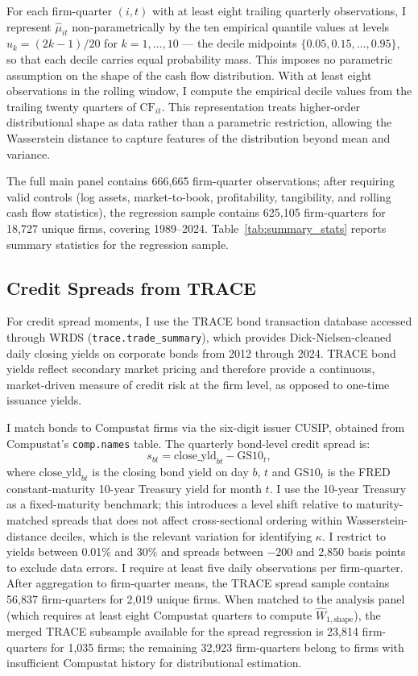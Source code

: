 For each firm-quarter $(i,t)$ with at least eight trailing quarterly observations, I represent $\hat{\mu}_{it}$ non-parametrically by the ten empirical quantile values at levels $u_k = (2k-1)/20$ for $k = 1,\ldots,10$ — the decile midpoints $\{0.05, 0.15, \ldots, 0.95\}$, so that each decile carries equal probability mass. This imposes no parametric assumption on the shape of the cash flow distribution. With at least eight observations in the rolling window, I compute the empirical decile values from the trailing twenty quarters of $\text{CF}_{it}$. This representation treats higher-order distributional shape as data rather than a parametric restriction, allowing the Wasserstein distance to capture features of the distribution beyond mean and variance.

The full main panel contains 666,665 firm-quarter observations; after requiring valid controls (log assets, market-to-book, profitability, tangibility, and rolling cash flow statistics), the regression sample contains 625,105 firm-quarters for 18,727 unique firms, covering 1989--2024. Table~\ref{tab:summary_stats} reports summary statistics for the regression sample.

\subsection{Credit Spreads from TRACE}

For credit spread moments, I use the TRACE bond transaction database accessed through WRDS (\texttt{trace.trade\_summary}), which provides Dick-Nielsen-cleaned daily closing yields on corporate bonds from 2012 through 2024. TRACE bond yields reflect secondary market pricing and therefore provide a continuous, market-driven measure of credit risk at the firm level, as opposed to one-time issuance yields.

I match bonds to Compustat firms via the six-digit issuer CUSIP, obtained from Compustat's \texttt{comp.names} table. The quarterly bond-level credit spread is:
\[
  s_{bt} = \text{close\_yld}_{bt} - \text{GS10}_t,
\]
where $\text{close\_yld}_{bt}$ is the closing bond yield on day $b$, $t$ and $\text{GS10}_t$ is the FRED constant-maturity 10-year Treasury yield for month $t$. I use the 10-year Treasury as a fixed-maturity benchmark; this introduces a level shift relative to maturity-matched spreads that does not affect cross-sectional ordering within Wasserstein-distance deciles, which is the relevant variation for identifying $\kappa$. I restrict to yields between 0.01\% and 30\% and spreads between $-200$ and 2,850 basis points to exclude data errors. I require at least five daily observations per firm-quarter. After aggregation to firm-quarter means, the TRACE spread sample contains 56,837 firm-quarters for 2,019 unique firms. When matched to the analysis panel (which requires at least eight Compustat quarters to compute $\widehat{W}_{1,\text{shape}}$), the merged TRACE subsample available for the spread regression is 23,814 firm-quarters for 1,035 firms; the remaining 32,923 firm-quarters belong to firms with insufficient Compustat history for distributional estimation.

